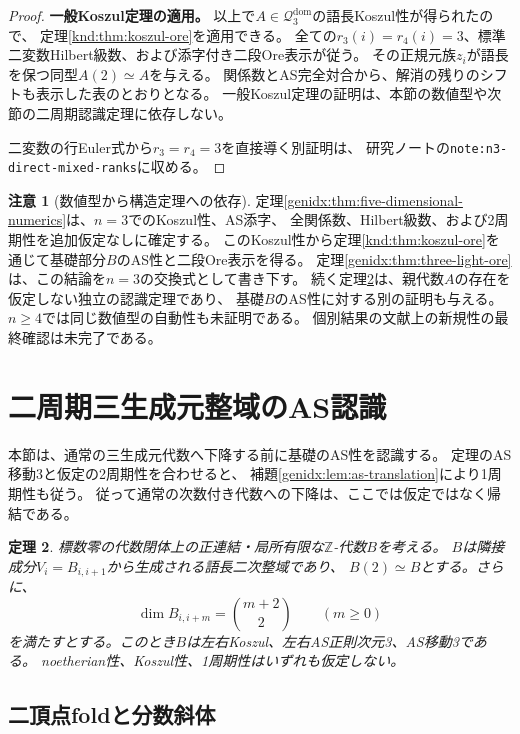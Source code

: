 \documentclass[11pt,a4paper]{ltjsarticle}
\newtheorem{theorem}{定理}[section]
\theoremstyle{definition}
\newtheorem{remark}[theorem]{注意}
\begin{document}
\begin{proof}
\par\smallskip\noindent\textbf{一般Koszul定理の適用。}\quad
以上で$A\in\mathcal Q_3^{\mathrm{dom}}$の語長Koszul性が得られたので、
定理\ref{knd:thm:koszul-ore}を適用できる。
全ての$r_3(i)=r_4(i)=3$、標準二変数Hilbert級数、および添字付き二段Ore表示が従う。
その正規元族$z_i$が語長を保つ同型$A(2)\simeq A$を与える。
関係数とAS完全対合から、解消の残りのシフトも表示した表のとおりとなる。
一般Koszul定理の証明は、本節の数値型や次節の二周期認識定理に依存しない。

二変数の行Euler式から$r_3=r_4=3$を直接導く別証明は、
研究ノートの\texttt{note:n3-direct-mixed-ranks}に収める。
\end{proof}

\begin{remark}[数値型から構造定理への依存]
定理\ref{genidx:thm:five-dimensional-numerics}は、$n=3$でのKoszul性、AS添字、
全関係数、Hilbert級数、および2周期性を追加仮定なしに確定する。
このKoszul性から定理\ref{knd:thm:koszul-ore}を通じて基礎部分$B$のAS性と二段Ore表示を得る。
定理\ref{genidx:thm:three-light-ore}は、この結論を$n=3$の交換式として書き下す。
続く定理\ref{p2base:thm:as3}は、親代数$A$の存在を仮定しない独立の認識定理であり、
基礎$B$のAS性に対する別の証明も与える。
$n\geq4$では同じ数値型の自動性も未証明である。
個別結果の文献上の新規性の最終確認は未完了である。
\end{remark}

\section{二周期三生成元整域のAS認識}\label{sec:two-period-recognition}

本節は、通常の三生成元代数へ下降する前に基礎のAS性を認識する。
定理のAS移動3と仮定の2周期性を合わせると、
補題\ref{genidx:lem:as-translation}により1周期性も従う。
従って通常の次数付き代数への下降は、ここでは仮定ではなく帰結である。

\begin{theorem}\label{p2base:thm:as3}
標数零の代数閉体上の正連結・局所有限な$\mathbb Z$-代数$B$を考える。
$B$は隣接成分$V_i=B_{i,i+1}$から生成される語長二次整域であり、
$B(2)\simeq B$とする。さらに、
\[
\dim B_{i,i+m}=\binom{m+2}{2}\qquad(m\ge0)
\]
を満たすとする。このとき$B$は左右Koszul、左右AS正則次元3、AS移動3である。
noetherian性、Koszul性、1周期性はいずれも仮定しない。
\end{theorem}

\subsection{二頂点foldと分数斜体}
\end{document}
